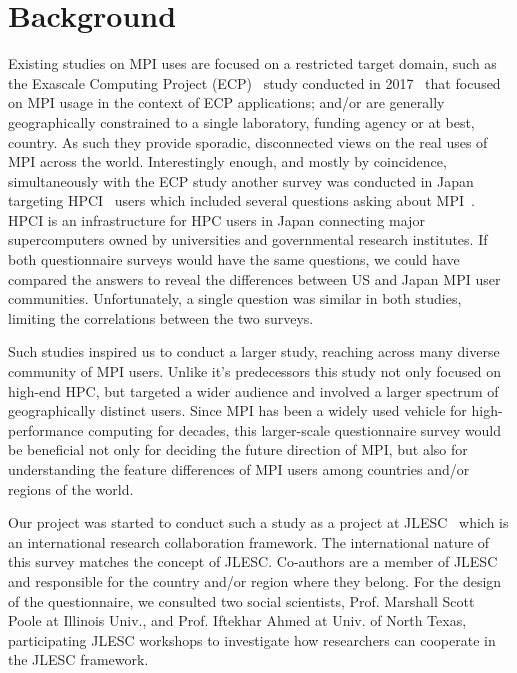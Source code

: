 \documentclass[conference,10pt,letterpaper]{IEEEtran}
\begin{document}
\section{Background}

Existing studies on MPI uses are focused on a restricted target
domain, such as the Exascale Computing Project (ECP)~\cite{ECP} study
conducted in 2017~\cite{osti_1462877} that focused on MPI usage in the
context of ECP applications; and/or are generally geographically
constrained to a single laboratory, funding agency or at best,
country. As such they provide sporadic, disconnected views on the real
uses of MPI across the world.
%
Interestingly enough, and mostly by coincidence, simultaneously with
the ECP study another survey was conducted in Japan targeting
HPCI~\cite{HPCI} users which included several questions asking about
MPI~\cite{hpci-user-survey}.  HPCI is an infrastructure for HPC users
in Japan connecting major supercomputers owned by universities and
governmental research institutes. If both questionnaire surveys would
have the same questions, we could have compared the answers to reveal
the differences between US and Japan MPI user
communities. Unfortunately, a single question was similar in both
studies, limiting the correlations between the two surveys.

Such studies inspired us to conduct a larger study, reaching across
many diverse community of MPI users. Unlike it's predecessors this
study not only focused on high-end HPC, but targeted a wider audience
and involved a larger spectrum of geographically distinct users. Since
MPI has been a widely used vehicle for high-performance computing for
decades, this larger-scale questionnaire survey would be beneficial
not only for deciding the future direction of MPI, but also for
understanding the feature differences of MPI users among countries
and/or regions of the world.

Our project was started to conduct such a study as a project at
JLESC~\cite{JLESC} which is an international research collaboration
framework. The international nature of this survey matches the concept
of JLESC. Co-authors are a member of JLESC and responsible for the
country and/or region where they belong. For the design of the questionnaire,
we consulted two social scientists, Prof. Marshall Scott Poole at
Illinois Univ., and Prof. Iftekhar Ahmed at Univ. of North Texas,
participating JLESC workshops to investigate how researchers can
cooperate in the JLESC framework. 
\end{document}
